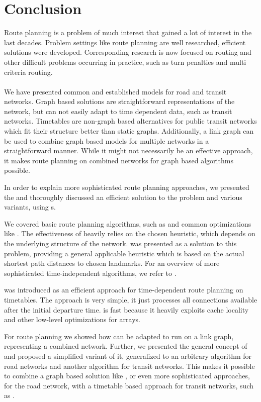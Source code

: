 \chapter{Conclusion}\label{conclusion}
	Route planning is a problem of much interest that gained a lot of interest in the last decades. Problem settings like \uniModal route planning are
	well researched, efficient solutions were developed. Corresponding research is now focused on \multiModal routing and other difficult problems
	occurring in practice, such as turn penalties and multi criteria routing.\\\\
	We have presented common and established models for road and transit networks. Graph based solutions are straightforward representations of the network,
	but can not easily adapt to time dependent data, such as transit networks. Timetables are non-graph based alternatives for public transit networks
	which fit their structure better than static graphs. Additionally, a link graph can be used to combine graph based models for multiple networks in a
	straightforward manner. While it might not necessarily be an effective approach, it makes route planning on combined networks for graph based
	algorithms possible.
	
	In order to explain more sophisticated route planning approaches, we presented the \nearestNeighborProblem and thoroughly discussed an
	efficient solution to the problem and various variants, using {\coverTree}s.
	
	We covered basic route planning algorithms, such as \dijkstra and common optimizations like \astar. The effectiveness of \astar heavily relies on the chosen
	heuristic, which depends on the underlying structure of the network. \alt was presented as a solution to this problem, providing a general applicable heuristic
	which is based on the actual shortest path distances to chosen landmarks. For an overview of more sophisticated \uniModal time-independent
	algorithms, we refer to .
	
	\csa was introduced as an efficient approach for time-dependent route planning on timetables. The approach is very simple, it just processes all connections
	available after the initial departure time. \csa is fast because it heavily exploits cache locality  and other low-level optimizations
	for arrays.
	
	For \multiModal route planning we showed how \dijkstra can be adapted to run on a link graph, representing a combined network. Further, we presented the
	general concept of \anr and proposed a simplified variant of it, generalized to an arbitrary algorithm for road networks and another algorithm for transit
	networks. This makes it possible to combine a graph based solution like \dijkstra, or even more sophisticated approaches, for the road network,
	with a timetable based approach for transit networks, such as \csa.
	

